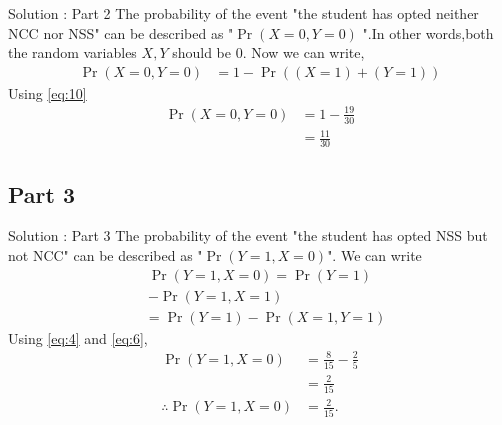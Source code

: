 \documentclass{beamer}
\providecommand{\pr}[1]{\ensuremath{\Pr\left(#1\right)}}
\providecommand{\brak}[1]{\ensuremath{\left(#1\right)}}
\begin{document}
\begin{frame}{Solution : Part 2}
       The probability of the event "the student has opted neither NCC nor NSS" can be described as "$ \pr{X=0,Y=0}$ ".In other words,both the random variables $X,Y$ should be 0.  
                 Now we can write,
                 \begin{align}
                   \pr{X=0,Y=0} &= 1 - \pr{\brak{X = 1} + \brak{Y = 1}}
                 \end{align}
                Using \eqref{eq:10}
                 \begin{align}
	           \pr{X=0,Y=0} &= 1 - \frac{19}{30}\\
                                       &= \frac{11}{30}                        
                 \end{align}
\end{frame}

\subsection{Part 3}

\begin{frame}{Solution : Part 3}
       The probability of the event "the student has opted NSS but not NCC" can be described as  "$ \pr{Y=1,X = 0}$". 
                We can write 
                 \begin{equation}
                 \begin{split}
                   \pr{Y=1, X = 0} = \pr{Y = 1} \\
                                                            - \pr{Y = 1,X = 1}
                 \end{split}
                 \end{equation}
                 \begin{align}
                                                  &= \pr{Y = 1} -  \pr{X = 1,Y=1}
                 \end{align}
               Using \eqref{eq:4} and \eqref{eq:6},
                 \begin{align}
	            \pr{Y=1, X = 0}  &=  \frac{8}{15} -  \frac{2}{5}\\
                                             & = \frac{2}{15}\\
                   \therefore  \pr{Y=1, X = 0} &= \frac{2}{15}.
                 \end{align}
\end{frame}
    
\end{document}
